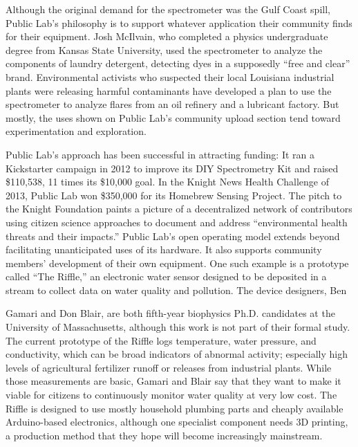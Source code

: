 Although the original demand for the spectrometer was the Gulf Coast
spill, Public Lab's philosophy is to support whatever application their community
finds for their equipment. Josh McIlvain, who completed a physics
undergraduate degree from Kansas State University, used the spectrometer
to analyze the components of laundry detergent, detecting dyes in a
supposedly ``free and clear'' brand. Environmental activists who suspected
their local Louisiana industrial plants were releasing harmful contaminants
have developed a plan to use the spectrometer to analyze flares from an oil
refinery and a lubricant factory. But mostly, the uses shown on Public Lab's
community upload section tend toward experimentation and exploration.

Public Lab's approach has been successful in attracting funding: It ran a
Kickstarter campaign in 2012 to improve its DIY Spectrometry Kit and
raised \$110,538, 11 times its \$10,000 goal. In the Knight News Health Challenge
of 2013, Public Lab won \$350,000 for its Homebrew Sensing Project.
The pitch to the Knight Foundation paints a picture of a decentralized
network of contributors using citizen science approaches to document and
address ``environmental health threats and their impacts.''
Public Lab's open operating model extends beyond facilitating unanticipated
uses of its hardware. It also supports community members' development
of their own equipment. One such example is a prototype called
``The Riffle,'' an electronic water sensor designed to be deposited in a stream
to collect data on water quality and pollution. The device designers, Ben

Gamari and Don Blair, are both fifth-year biophysics Ph.D. candidates at the
University of Massachusetts, although this work is not part of their formal
study. The current prototype of the Riffle logs temperature, water pressure,
and conductivity, which can be broad indicators of abnormal activity; especially
high levels of agricultural fertilizer runoff or releases from industrial
plants. While those measurements are basic, Gamari and Blair say that they
want to make it viable for citizens to continuously monitor water quality
at very low cost. The Riffle is designed to use mostly household plumbing
parts and cheaply available Arduino-based electronics, although one specialist
component needs 3D printing, a production method that they hope
will become increasingly mainstream.

